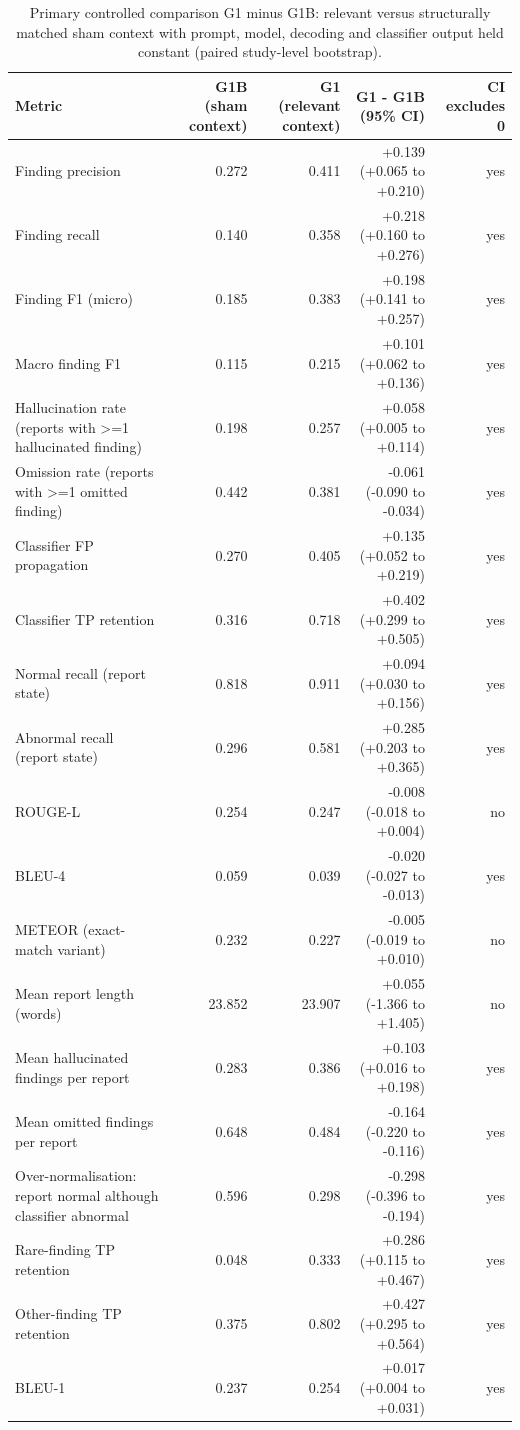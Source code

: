 \begin{table}[t]
\centering
\scriptsize
\begin{tabular}{lrrrr}
\hline
Metric & G1B (sham context) & G1 (relevant context) & G1 - G1B (95\% CI) & CI excludes 0 \\
\hline
Finding precision & 0.272 & 0.411 & +0.139 (+0.065 to +0.210) & yes \\
Finding recall & 0.140 & 0.358 & +0.218 (+0.160 to +0.276) & yes \\
Finding F1 (micro) & 0.185 & 0.383 & +0.198 (+0.141 to +0.257) & yes \\
Macro finding F1 & 0.115 & 0.215 & +0.101 (+0.062 to +0.136) & yes \\
Hallucination rate (reports with >=1 hallucinated finding) & 0.198 & 0.257 & +0.058 (+0.005 to +0.114) & yes \\
Omission rate (reports with >=1 omitted finding) & 0.442 & 0.381 & -0.061 (-0.090 to -0.034) & yes \\
Classifier FP propagation & 0.270 & 0.405 & +0.135 (+0.052 to +0.219) & yes \\
Classifier TP retention & 0.316 & 0.718 & +0.402 (+0.299 to +0.505) & yes \\
Normal recall (report state) & 0.818 & 0.911 & +0.094 (+0.030 to +0.156) & yes \\
Abnormal recall (report state) & 0.296 & 0.581 & +0.285 (+0.203 to +0.365) & yes \\
ROUGE-L & 0.254 & 0.247 & -0.008 (-0.018 to +0.004) & no \\
BLEU-4 & 0.059 & 0.039 & -0.020 (-0.027 to -0.013) & yes \\
METEOR (exact-match variant) & 0.232 & 0.227 & -0.005 (-0.019 to +0.010) & no \\
Mean report length (words) & 23.852 & 23.907 & +0.055 (-1.366 to +1.405) & no \\
Mean hallucinated findings per report & 0.283 & 0.386 & +0.103 (+0.016 to +0.198) & yes \\
Mean omitted findings per report & 0.648 & 0.484 & -0.164 (-0.220 to -0.116) & yes \\
Over-normalisation: report normal although classifier abnormal & 0.596 & 0.298 & -0.298 (-0.396 to -0.194) & yes \\
Rare-finding TP retention & 0.048 & 0.333 & +0.286 (+0.115 to +0.467) & yes \\
Other-finding TP retention & 0.375 & 0.802 & +0.427 (+0.295 to +0.564) & yes \\
BLEU-1 & 0.237 & 0.254 & +0.017 (+0.004 to +0.031) & yes \\
\hline
\end{tabular}
\caption{Primary controlled comparison G1 minus G1B: relevant versus structurally matched sham context with prompt, model, decoding and classifier output held constant (paired study-level bootstrap).}
\label{tab:table2_g1_minus_g1b_controlled_comparison}
\end{table}
